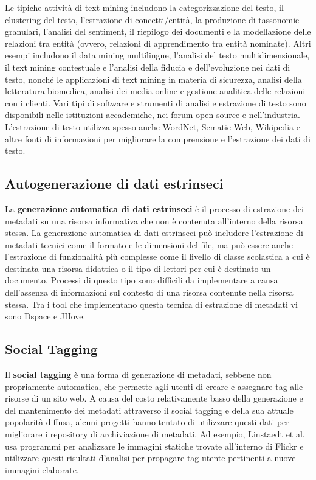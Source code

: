 Le tipiche attività di text mining includono la categorizzazione del testo, il clustering del testo, l'estrazione di concetti/entità, la produzione di tassonomie granulari, l'analisi del sentiment, il riepilogo dei documenti e la modellazione delle relazioni tra entità (ovvero, relazioni di apprendimento tra entità nominate). Altri esempi includono il data mining multilingue, l'analisi del testo multidimensionale, il text mining contestuale e l'analisi della fiducia e dell'evoluzione nei dati di testo, nonché le applicazioni di text mining in materia di sicurezza, analisi della letteratura biomedica, analisi dei media online e gestione analitica delle relazioni con i clienti. Vari tipi di software e strumenti di analisi e estrazione di testo sono disponibili nelle istituzioni accademiche, nei forum open source e nell'industria. L'estrazione di testo utilizza spesso anche WordNet, Sematic Web, Wikipedia e altre fonti di informazioni per migliorare la comprensione e l'estrazione dei dati di testo.\cite{textmining}

\subsection{Autogenerazione di dati estrinseci}
La \textbf{generazione automatica di dati estrinseci} è il processo di estrazione dei metadati su una risorsa informativa che non è contenuta all'interno della risorsa stessa. La generazione automatica di dati estrinseci può includere l'estrazione di metadati tecnici come il formato e le dimensioni del file, ma può essere anche l'estrazione di funzionalità più complesse come il livello di classe scolastica a cui è destinata una risorsa didattica o il tipo di lettori per cui è destinato un documento.
Processi di questo tipo sono difficili da implementare a causa dell'assenza di informazioni sul contesto di una risorsa
contenute nella risorsa stessa.
Tra i tool che implementano questa tecnica di estrazione di metadati vi sono Dspace e JHove.

\subsection{Social Tagging}
Il \textbf{social tagging} è una forma di generazione di metadati, sebbene non propriamente automatica, che permette agli utenti di creare e assegnare tag alle risorse di un sito web. A causa del costo relativamente basso della generazione e del mantenimento dei metadati attraverso il social tagging e della sua attuale popolarità diffusa, alcuni progetti hanno tentato di utilizzare questi dati per migliorare i repository di archiviazione di metadati. Ad esempio, Linstaedt et al. usa programmi per analizzare le immagini statiche trovate all'interno di Flickr e utilizzare questi risultati d'analisi per propagare tag utente pertinenti a nuove immagini elaborate.

